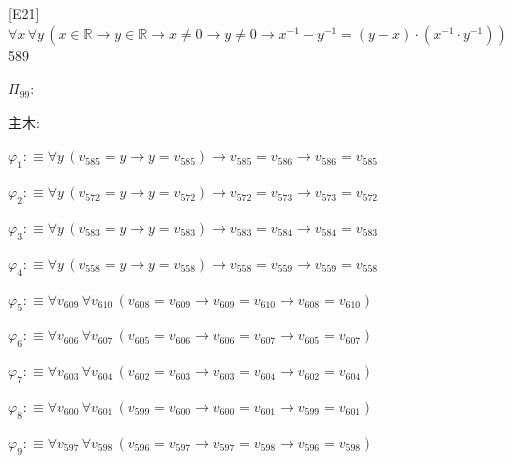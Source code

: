 \begin{fullproof}{[E21]}{$\forall x\,\forall y\,(x \in \mathbb{R} \to y \in \mathbb{R} \to x \neq 0 \to y \neq 0 \to x^{-1} - y^{-1} = (y - x) \cdot (x^{-1} \cdot y^{-1}))$}{589}
\begin{ptree}
\end{ptree}
\noindent$\Pi_{99}$:
\begin{ptree}
\noLine
{}
\noLine
{}
\end{ptree}
\noindent 主木:
\begin{ptree}
\noLine
{}
\noLine
{}
\end{ptree}
\begin{abbrevlist}
\item $\varphi_{1} :\equiv \forall y\,(v_{585} = y \to y = v_{585}) \to v_{585} = v_{586} \to v_{586} = v_{585}$
\item $\varphi_{2} :\equiv \forall y\,(v_{572} = y \to y = v_{572}) \to v_{572} = v_{573} \to v_{573} = v_{572}$
\item $\varphi_{3} :\equiv \forall y\,(v_{583} = y \to y = v_{583}) \to v_{583} = v_{584} \to v_{584} = v_{583}$
\item $\varphi_{4} :\equiv \forall y\,(v_{558} = y \to y = v_{558}) \to v_{558} = v_{559} \to v_{559} = v_{558}$
\item $\varphi_{5} :\equiv \forall v_{609}\,\forall v_{610}\,(v_{608} = v_{609} \to v_{609} = v_{610} \to v_{608} = v_{610})$
\item $\varphi_{6} :\equiv \forall v_{606}\,\forall v_{607}\,(v_{605} = v_{606} \to v_{606} = v_{607} \to v_{605} = v_{607})$
\item $\varphi_{7} :\equiv \forall v_{603}\,\forall v_{604}\,(v_{602} = v_{603} \to v_{603} = v_{604} \to v_{602} = v_{604})$
\item $\varphi_{8} :\equiv \forall v_{600}\,\forall v_{601}\,(v_{599} = v_{600} \to v_{600} = v_{601} \to v_{599} = v_{601})$
\item $\varphi_{9} :\equiv \forall v_{597}\,\forall v_{598}\,(v_{596} = v_{597} \to v_{597} = v_{598} \to v_{596} = v_{598})$

\end{abbrevlist}
\end{fullproof}
